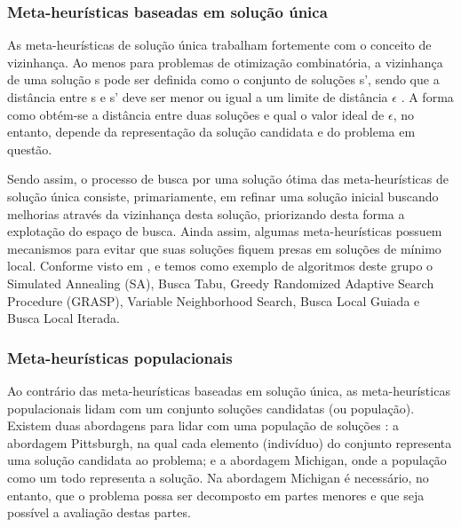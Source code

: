 \subsubsection{Meta-heurísticas baseadas em solução única}
\label{subsec:subc2151}
As meta-heurísticas de solução única trabalham fortemente com o conceito de vizinhança. Ao menos para problemas de otimização combinatória, a vizinhança de uma solução s pode ser definida como o conjunto de soluções s', sendo que a distância entre s e s' deve ser menor ou igual a um limite de distância $\epsilon$ \cite{Talbi2009}. A forma como obtém-se a distância entre duas soluções e qual o valor ideal de $\epsilon$, no entanto, depende da representação da solução candidata e do problema em questão.

Sendo assim, o processo de busca por uma solução ótima das meta-heurísticas de solução única consiste, primariamente, em refinar uma solução inicial buscando melhorias através da vizinhança desta solução, priorizando desta forma a explotação do espaço de busca. Ainda assim, algumas meta-heurísticas possuem mecanismos para evitar que suas soluções fiquem presas em soluções de mínimo local. Conforme visto em ,  e  temos como exemplo de algoritmos deste grupo o Simulated Annealing (SA), Busca Tabu, Greedy Randomized Adaptive Search Procedure (GRASP), Variable Neighborhood Search, Busca Local Guiada e Busca Local Iterada.

\subsubsection{Meta-heurísticas populacionais}
\label{subsec:subc2152}
Ao contrário das meta-heurísticas baseadas em solução única, as meta-heurísticas populacionais lidam com um conjunto soluções candidatas (ou população). Existem duas abordagens para lidar com uma população de soluções \cite{Freitas2003,Ishibuchi1997}: a abordagem Pittsburgh, na qual cada elemento (indivíduo) do conjunto representa uma solução candidata ao problema; e a abordagem Michigan, onde a população como um todo representa a solução. Na abordagem Michigan é necessário, no entanto, que o problema possa ser decomposto em partes menores e que seja possível a avaliação destas partes.

